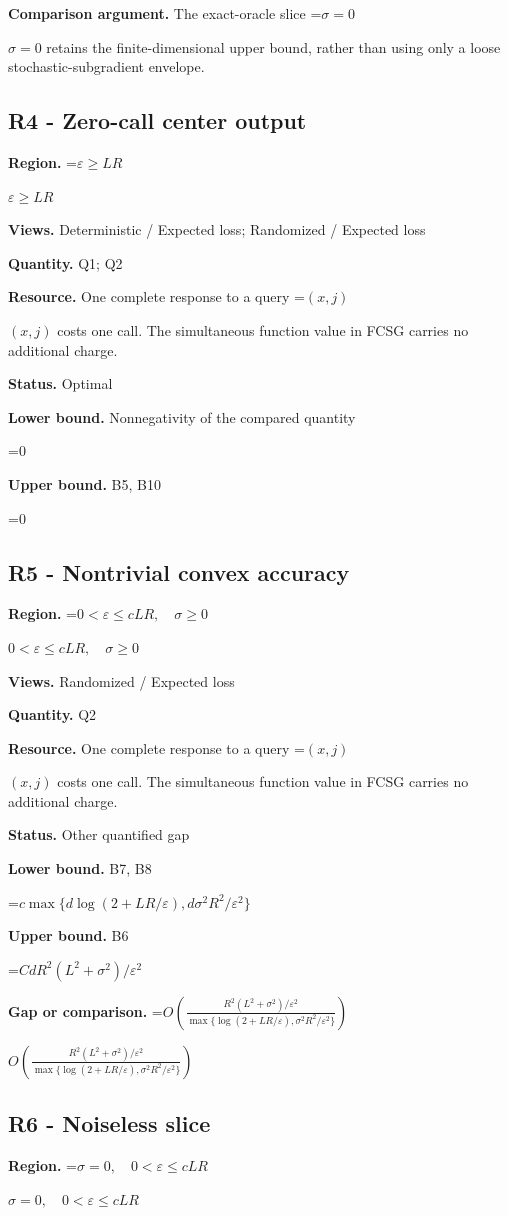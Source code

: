 \documentclass[10pt,a4paper]{article}
\newcommand{\AtlasMath}[1]{\par\begingroup\centering\setbox0=\hbox{$\displaystyle #1$}\ifdim\wd0>1.4\linewidth\typeout{ATLAS WIDE FORMULA: \the\wd0}\fi\ifdim\wd0>\linewidth\resizebox{\linewidth}{!}{\box0}\else\box0\fi\par\endgroup}
\newcommand{\AtlasInlineMath}[1]{\begingroup\setbox0=\hbox{$#1$}\ifdim\wd0>.4\linewidth\endgroup\AtlasMath{#1}\else\endgroup$#1$\fi}
\begin{document}
\textbf{Comparison argument.} The exact-oracle slice \AtlasInlineMath{\sigma=0} retains the finite-dimensional upper bound, rather than using only a loose stochastic-subgradient envelope.

\subsection{R4 - Zero-call center output}
\textbf{Region.} \AtlasInlineMath{\varepsilon\ge LR}

\textbf{Views.} Deterministic / Expected loss; Randomized / Expected loss

\textbf{Quantity.} Q1; Q2

\textbf{Resource.} One complete response to a query \AtlasInlineMath{(x,j)} costs one call. The simultaneous function value in FCSG carries no additional charge.

\textbf{Status.} Optimal

\textbf{Lower bound.} Nonnegativity of the compared quantity

\AtlasMath{0}
\textbf{Upper bound.} B5, B10

\AtlasMath{0}
\subsection{R5 - Nontrivial convex accuracy}
\textbf{Region.} \AtlasInlineMath{0<\varepsilon\le cLR,\quad\sigma\ge0}

\textbf{Views.} Randomized / Expected loss

\textbf{Quantity.} Q2

\textbf{Resource.} One complete response to a query \AtlasInlineMath{(x,j)} costs one call. The simultaneous function value in FCSG carries no additional charge.

\textbf{Status.} Other quantified gap

\textbf{Lower bound.} B7, B8

\AtlasMath{c\max\{d\log(2+LR/\varepsilon),d\sigma^2R^2/\varepsilon^2\}}
\textbf{Upper bound.} B6

\AtlasMath{CdR^2(L^2+\sigma^2)/\varepsilon^2}
\textbf{Gap or comparison.} \AtlasInlineMath{O\!\left(\frac{R^2(L^2+\sigma^2)/\varepsilon^2}{\max\{\log(2+LR/\varepsilon),\sigma^2R^2/\varepsilon^2\}}\right)}

\subsection{R6 - Noiseless slice}
\textbf{Region.} \AtlasInlineMath{\sigma=0,\quad0<\varepsilon\le cLR}
\end{document}
